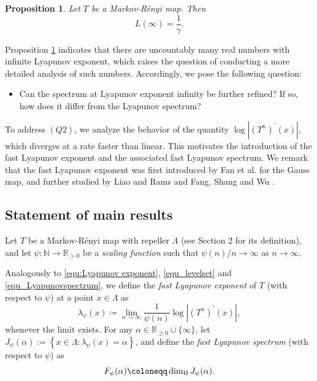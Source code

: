 \documentclass[12pt,reqno]{amsart}
\renewcommand{\=}{\coloneqq}
\theoremstyle{plain}
\newtheorem{proposition}[theorem]{Proposition}
\begin{document}
\begin{proposition}\label{LSinfty}
Let $T$ be a Markov-R\'{e}nyi map. Then
$$
L(\infty)=\frac{1}{\gamma}.
$$
\end{proposition}

Proposition \ref{LSinfty} indicates that there are uncountably many real numbers with infinite Lyapunov exponent, which raises the question of conducting a more detailed analysis of such numbers. Accordingly, we pose the following question:
\begin{itemize}
    \item[(Q2)] Can the spectrum at Lyapunov exponent infinity be further refined? If so, how does it differ from the Lyapunov spectrum?
\end{itemize}

To address $(Q2)$, we analyze the behavior of the quantity $\log |(T^n)^\prime(x)|$, which diverges at a rate faster than linear.
This motivates the introduction of the fast Lyapunov exponent and the associated fast Lyapunov spectrum.
We remark that the fast Lyapunov exponent was first introduced by Fan et al. \cite{FLWW09,FLWW13} for the Gauss map, and further studied by Liao and Rams \cite{LR} and Fang, Shang and Wu \cite{FSW}.










\subsection{Statement of main results}
Let $T$ be a Markov-R\'{e}nyi map with repeller $\Lambda$ (see Section 2 for its definition), and let $\psi:\mathbb{N}\to\mathbb{R}_{>0}$ be a \emph{scaling function} such that $\psi(n)/n \to \infty$ as $n\to \infty$.

Analogously to \eqref{equ:Lyapunov exponent}, \eqref{equ_levelset} and \eqref{equ_Lyapunovspectrum}, we define the \emph{fast Lyapunov exponent} of $T$ (with respect to $\psi$) at a point $x\in \Lambda$ as
\begin{equation*}\label{equ_fastlypunovexponent}
\lambda_{\psi}(x)\coloneqq \lim_{n \to \infty}\frac{1}{\psi(n)}\log |(T^n)^\prime(x)|,
\end{equation*}
whenever the limit exists. For any $\alpha\in\mathbb{R}_{\geq 0} \cup\{\infty\}$, let $J_{\psi}(\alpha):=\left\{x\in \Lambda: \lambda_{\psi}(x) =\alpha\right\}$,
and define the \emph{fast Lyapunov spectrum} (with respect to $\psi$) as
\begin{equation*}\label{equ_fastLspectrum}
F_{\psi}(\alpha)\coloneqq \dim_{\rm H}J_{\psi}(\alpha).
\end{equation*}
\end{document}

